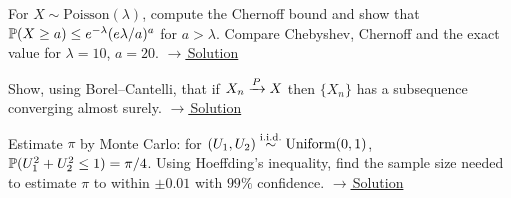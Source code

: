 \documentclass[main.tex]{subfiles}
\begin{document}
\begin{exercise}\label{exr:05-2}
For $X\sim\text{Poisson}(\lambda)$, compute the Chernoff bound and show that $\P(X\ge a)\le e^{-\lambda}(e\lambda/a)^a$ for $a>\lambda$. Compare Chebyshev, Chernoff and the exact value for $\lambda=10$, $a=20$.
\hfill\hyperref[coz:05-2]{\footnotesize$\rightarrow$\,Solution}
\end{exercise}

\begin{exercise}\label{exr:05-3}
Show, using Borel--Cantelli, that if $X_n\pto X$ then $\{X_n\}$ has a subsequence converging almost surely.
\hfill\hyperref[coz:05-3]{\footnotesize$\rightarrow$\,Solution}
\end{exercise}

\begin{exercise}\label{exr:05-4}
Estimate $\pi$ by Monte Carlo: for $(U_1,U_2)\iid\text{Uniform}(0,1)$, $\P(U_1^2+U_2^2\le1)=\pi/4$. Using Hoeffding's inequality, find the sample size needed to estimate $\pi$ to within $\pm0.01$ with $99\%$ confidence.
\hfill\hyperref[coz:05-4]{\footnotesize$\rightarrow$\,Solution}
\end{exercise}

\end{document}
